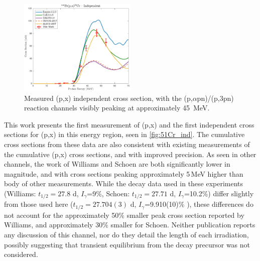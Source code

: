 \begin{figure}[h]
 \centering
 \includegraphics[width=0.5\textwidth]{./figures/51Cr_ind.pdf}
 \caption{Measured (p,x) independent cross section, with the (p,$\alpha$pn)/(p,3pn) reaction channels visibly peaking at approximately \mbox{45 MeV}.}
 \label{fig:51Cr_ind}
\end{figure}




This work presents the first measurement of (p,x) and  the first independent cross sections for       (p,x) in this energy region, seen in \autoref{fig:51Cr_ind}. 
The cumulative cross sections from these data are also consistent with existing measurements of the cumulative (p,x) cross sections, and with improved precision.
As seen in other channels, the work of Williams and Schoen \cite{PhysRev.162.1055,Schoen1979a} are both significantly lower in magnitude, and with cross sections peaking approximately 5\,MeV higher than body of other measurements. 
While the  decay data used in these experiments (Williams: $t_{1/2}=27.8$ d, $I_\gamma$=9\%, Schoen: $t_{1/2}=27.71$ d, $I_\gamma$=10.2\%) differ slightly from those used here ($t_{1/2}=27.704(3)$ d, $I_\gamma$=9.910(10)\% \cite{Wang2017}), these differences do not account for the approximately 50\% smaller peak cross section reported by Williams, and approximately 30\%  smaller for Schoen. 
Neither publication reports any discussion of this channel, nor do they detail the length of each irradiation, possibly suggesting that transient equilibrium from the  decay precursor was not considered. 
 

